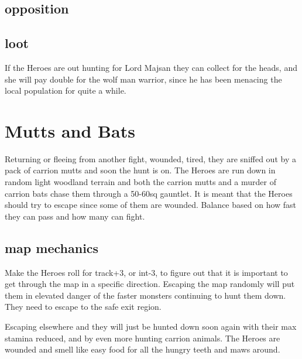 \subsection*{opposition}



\subsection*{loot}
If the Heroes are out hunting for Lord Majsan they can collect for the heads, and she will pay double for the wolf man warrior, since he has been menacing the local population for quite a while.





\section*{Mutts and Bats}
Returning or fleeing from another fight, wounded, tired, they are sniffed out by a pack of carrion mutts and soon the hunt is on. The Heroes are run down in random light woodland terrain and both the carrion mutts and a murder of carrion bats chase them through a 50-60sq gauntlet.
It is meant that the Heroes should try to escape since some of them are wounded. Balance based on how fast they can pass and how many can fight.


\subsection*{map mechanics}
Make the Heroes roll for track+3, or int-3, to figure out that it is important to get through the map in a specific direction. Escaping the map randomly will put them in elevated danger of the faster monsters continuing to hunt them down. They need to escape to the safe exit region.

Escaping elsewhere and they will just be hunted down soon again with their max stamina reduced, and by even more hunting carrion animals. The Heroes are wounded and smell like easy food for all the hungry teeth and maws around.


